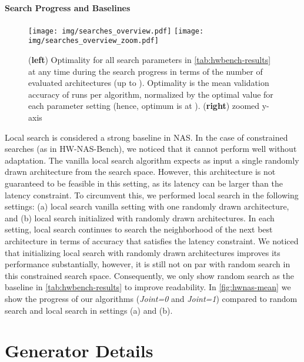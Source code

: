 \documentclass[runningheads]{llncs}
\begin{document}
\paragraph{Search Progress and Baselines}
\begin{figure}[h]
	\centering
	\texttt{[image: img/searches\_overview.pdf]}
	\texttt{[image: img/searches\_overview\_zoom.pdf]}
	
	\caption{(\textbf{left})
		Optimality for all search parameters in \autoref{tab:hwbench-results} at any time during the search progress in terms of the number of evaluated architectures (up to ).
		Optimality is the mean validation accuracy of  runs per algorithm, normalized by the optimal value for each parameter setting (hence, optimum is at ). (\textbf{right}) zoomed y-axis
	}
	\label{fig:hwnas-mean}\label{fig:hwnas-mean-zoom}
\end{figure}
Local search \cite{2020LocalSearchNAS} is considered a strong baseline in NAS.
In the case of constrained searches (as in HW-NAS-Bench), we noticed that it cannot perform well without adaptation.
The vanilla local search algorithm expects as input a single randomly drawn architecture from the search space.
However, this architecture is not guaranteed to be feasible in this setting, as its latency can be larger than the latency constraint.
To circumvent this, we performed local search in the following settings: (a) local search vanilla setting with one randomly drawn architecture, and (b) local search initialized with  randomly drawn architectures.
In each setting, local search continues to search the neighborhood of the next best architecture in terms of accuracy that satisfies the latency constraint.
We noticed that initializing local search with  randomly drawn architectures improves its performance substantially, however, it is still not on par with random search \cite{2019RS} in this constrained search space.
Consequently, we only show random search as the baseline in \autoref{tab:hwbench-results} to improve readability.
In \autoref{fig:hwnas-mean} we show the progress of our algorithms (\emph{Joint=0} and \emph{Joint=1}) compared to random search and local search in settings (a) and (b).


\section{Generator Details}\label{sec:generator}\label{supp:sec_generator_ability}
\end{document}
